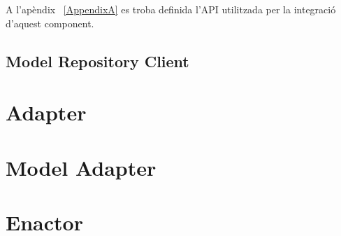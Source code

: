 A l'apèndix ~\ref{AppendixA} es troba definida l'API utilitzada per la integració d'aquest component.

\subsection{Model Repository Client}



\section{Adapter}

\section{Model Adapter}

\section{Enactor}
